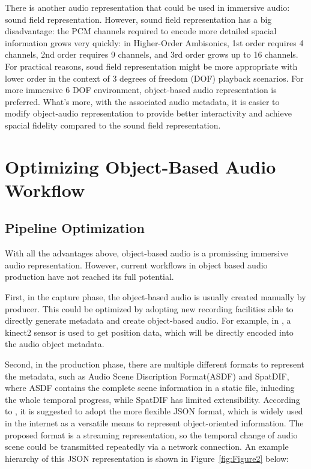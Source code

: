 \documentclass[jou]{apa6}
\begin{document}
There is another audio representation that could be used in immersive audio: sound field representation. However, sound field representation has a big disadvantage: the PCM channels required to encode more detailed spacial information grows very quickly: in Higher-Order Ambisonics, 1st order requires 4 channels, 2nd order requires 9 channels, and 3rd order grows up to 16 channels. For practical reasons, soud field representation might be more appropriate with lower order in the context of 3 degrees of freedom (DOF) playback scenarios. For more immersive 6 DOF environment, object-based audio representation is preferred. What's more, with the associated audio metadata, it is easier to modify object-audio representation to provide better interactivity and achieve spacial fidelity compared to the sound field representation.

\section{Optimizing Object-Based Audio Workflow}

\subsection{Pipeline Optimization}

With all the advantages above, object-based audio is a promissing immersive audio representation. However, current workflows in object based audio production have not reached its full potential.

First, in the capture phase, the object-based audio is usually created manually by producer. This could be optimized by adopting new recording facilities able to directly generate metadata and create object-based audio. For example, in \textcite{coleman2018audio}, a kinect2 sensor is used to get position data, which will be directly encoded into the audio object metadata.

Second, in the production phase, there are multiple different formats to represent the metadata, such as Audio Scene Discription Format(ASDF) and SpatDIF, where ASDF contains the complete scene information in a static file, inlucding the whole temporal progress, while SpatDIF has limited extensibility. According to \textcite{coleman2018audio}, it is suggested to adopt the more flexible JSON format, which is widely used in the internet as a versatile means to represent object-oriented information. The proposed format is a streaming representation, so the temporal change of audio scene could be transmitted repeatedly via a network connection. An example hierarchy of this JSON representation is shown in Figure~\ref{fig:Figure2} below:
\end{document}
